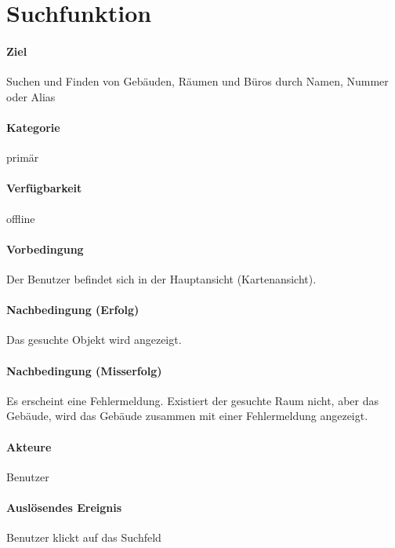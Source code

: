 \section{Suchfunktion}
\paragraph{Ziel}
Suchen und Finden von Gebäuden, Räumen und Büros durch Namen, Nummer oder Alias
\paragraph{Kategorie}
primär
\paragraph{Verfügbarkeit}
offline
\paragraph{Vorbedingung}
Der Benutzer befindet sich in der Hauptansicht (Kartenansicht).
\paragraph{Nachbedingung (Erfolg)}
Das gesuchte Objekt wird angezeigt.
\paragraph{Nachbedingung (Misserfolg)}
Es erscheint eine Fehlermeldung. Existiert der gesuchte Raum nicht, aber das Gebäude, wird das Gebäude zusammen mit einer Fehlermeldung angezeigt.
\paragraph{Akteure}
Benutzer
\paragraph{Auslösendes Ereignis}
Benutzer klickt auf das Suchfeld

